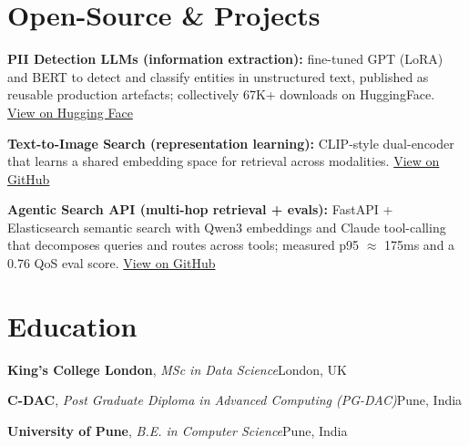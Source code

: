 \documentclass[10pt,a4paper]{article}
\begin{document}
\section{Open-Source \& Projects}
\begin{tight}
  \item \textbf{PII Detection LLMs (information extraction):} fine-tuned GPT (LoRA) and BERT to detect and classify entities in unstructured text, published as reusable production artefacts; collectively 67K+ downloads on HuggingFace. \href{https://huggingface.co/ab-ai/pii_model}{View on Hugging Face}
  \item \textbf{Text-to-Image Search (representation learning):} CLIP-style dual-encoder that learns a shared embedding space for retrieval across modalities. \href{https://github.com/abhijeetscode/text-to-image-search}{View on GitHub}
  \item \textbf{Agentic Search API (multi-hop retrieval + evals):} FastAPI + Elasticsearch semantic search with Qwen3 embeddings and Claude tool-calling that decomposes queries and routes across tools; measured p95 $\approx$ 175ms and a 0.76 QoS eval score. \href{https://github.com/abhijeetscode/search-agent}{View on GitHub}
\end{tight}

\section{Education}
{\color{company}\bfseries King's College London}, {\itshape MSc in Data Science}\hfill {\color{muted}London, UK}\par\vspace{1pt}
{\color{company}\bfseries C-DAC}, {\itshape Post Graduate Diploma in Advanced Computing (PG-DAC)}\hfill {\color{muted}Pune, India}\par\vspace{1pt}
{\color{company}\bfseries University of Pune}, {\itshape B.E. in Computer Science}\hfill {\color{muted}Pune, India}\par
\end{document}
